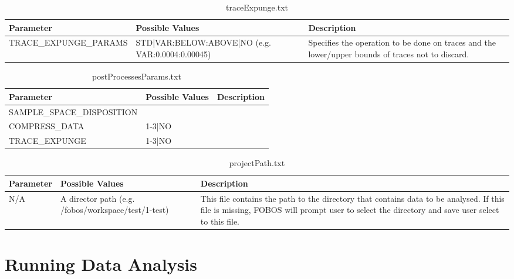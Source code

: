 \begin{table}[H]
  \begin{center}
    \caption{traceExpunge.txt}
    \begin{tabular}{|p{4cm}|p{2cm}|p{7cm}|} \hline 
    Parameter & Possible Values  & Description \\ \hline   
    TRACE\_EXPUNGE\_PARAMS &  STD|VAR:BELOW:ABOVE|NO (e.g. VAR:0.0004:0.00045) &    Specifies the operation to be done on traces 
    																				and the lower/upper bounds of traces not to
    																				discard. \\ \hline
    \end{tabular}
  \end{center}
\end{table}


\begin{table}[H]
  \begin{center}
    \caption{postProcessesParams.txt}
    \begin{tabular}{|p{4cm}|p{2cm}|p{7cm}|} \hline 
    Parameter & Possible Values  & Description \\ \hline   
    SAMPLE\_SPACE\_DISPOSITION  &   &     \\ \hline
    COMPRESS\_DATA  & 1-3|NO  &     \\ \hline
    TRACE\_EXPUNGE  & 1-3|NO  &     \\ \hline
    \end{tabular}
  \end{center}
\end{table}

\begin{table}[H]
  \begin{center}
    \caption{projectPath.txt}
    \begin{tabular}{|p{4cm}|p{2cm}|p{7cm}|} \hline 
    Parameter & Possible Values  & Description \\ \hline   
    N/A & A director path (e.g. /fobos/workspace/test/1-test) & This file contains the path to the directory that contains data to be analysed.
    															If this file is missing, FOBOS will prompt user to select the directory and save user
    															select to this file. \\ \hline
    
    \end{tabular}
  \end{center}
\end{table}

\section{Running Data Analysis}

